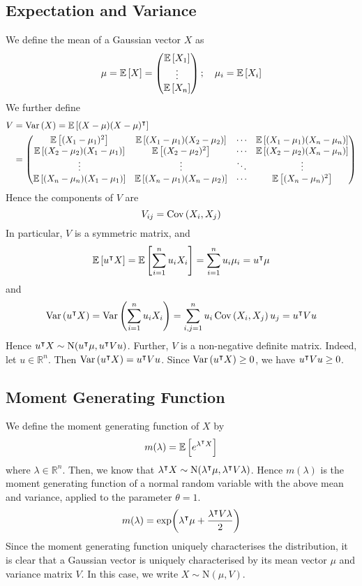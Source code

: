 \subsection{Expectation and Variance}
We define the mean of a Gaussian vector \(X\) as
\[
	\mu = \mathbb{E}\left[{X}\right] = \begin{pmatrix}
		\mathbb{E}\left[{X_1}\right] \\ \vdots \\ \mathbb{E}\left[{X_n}\right]
	\end{pmatrix};\quad \mu_i = \mathbb{E}\left[{X_i}\right]
\]
We further define
\begin{align*}
	V & = \operatorname{Var}\left({X}\right) = \mathbb{E}\left[{(X - \mu) (X - \mu)^\intercal}\right] \\
	  & = \begin{pmatrix}
		\mathbb{E}\left[{(X_1 - \mu_1)^2}\right]            & \mathbb{E}\left[{(X_1 - \mu_1)(X_2 - \mu_2)}\right] & \cdots & \mathbb{E}\left[{(X_1 - \mu_1)(X_n - \mu_n)}\right] \\
		\mathbb{E}\left[{(X_2 - \mu_2)(X_1 - \mu_1)}\right] & \mathbb{E}\left[{(X_2 - \mu_2)^2}\right]            & \cdots & \mathbb{E}\left[{(X_2 - \mu_2)(X_n - \mu_n)}\right] \\
		\vdots                              & \vdots                              & \ddots & \vdots                              \\
		\mathbb{E}\left[{(X_n - \mu_n)(X_1 - \mu_1)}\right] & \mathbb{E}\left[{(X_n - \mu_1)(X_n - \mu_2)}\right] & \cdots & \mathbb{E}\left[{(X_n - \mu_n)^2}\right]
	\end{pmatrix}
\end{align*}
Hence the components of \(V\) are
\[
	V_{ij} = \operatorname{Cov}\left({X_i, X_j}\right)
\]
In particular, \(V\) is a symmetric matrix, and
\[
	\mathbb{E}\left[{u^\intercal X}\right] = \mathbb{E}\left[{\sum_{i=1}^n u_i X_i}\right] = \sum_{i=1}^n u_i \mu_i = u^\intercal \mu
\]
and
\[
	\operatorname{Var}\left({u^\intercal X}\right) = \operatorname{Var}\left({\sum_{i=1}^n u_i X_i}\right) = \sum_{i,j = 1}^n u_i \operatorname{Cov}\left({X_i, X_j}\right) u_j = u^\intercal V u
\]
Hence \(u^\intercal X \sim \mathrm{N}(u^\intercal \mu, u^\intercal V u)\).
Further, \(V\) is a non-negative definite matrix.
Indeed, let \(u \in \mathbb R^n\).
Then \(\operatorname{Var}\left({u^\intercal X}\right) = u^\intercal V u\).
Since \(\operatorname{Var}\left({u^\intercal X}\right) \geq 0\), we have \(u^\intercal V u \geq 0\).

\subsection{Moment Generating Function}
We define the moment generating function of \(X\) by
\[
	m(\lambda) = \mathbb{E}\left[{e^{\lambda^\intercal X}}\right]
\]
where \(\lambda \in \mathbb R^n\).
Then, we know that \(\lambda^\intercal X \sim \mathrm{N}(\lambda^\intercal \mu, \lambda^\intercal V \lambda)\).
Hence \(m(\lambda)\) is the moment generating function of a normal random variable with the above mean and variance, applied to the parameter \(\theta = 1\).
\[
	m(\lambda) = \exp(\lambda^\intercal \mu + \frac{\lambda^\intercal V\lambda}{2})
\]
Since the moment generating function uniquely characterises the distribution, it is clear that a Gaussian vector is uniquely characterised by its mean vector \(\mu\) and variance matrix \(V\).
In this case, we write \(X \sim \mathrm{N}(\mu, V)\).

